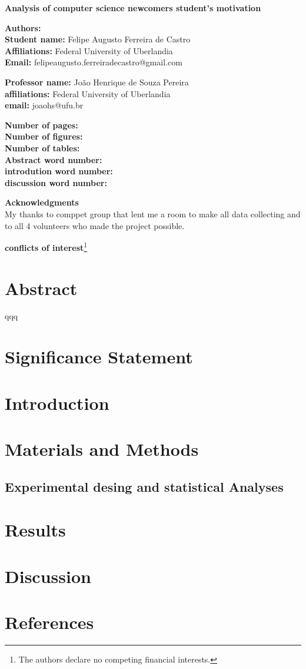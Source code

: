 \documentclass[12pt,openright,a4paper]{article}
\begin{document}
	\linespread{1.5}
 \fontsize{16}{10}\selectfont \centering \textbf{Analysis of computer science newcomers student's motivation} \\
	\fontsize{14}{10}\selectfont {Analysis of student's motivation}\newline

\fontsize{12}{10}
\flushleft
	\textbf{Authors:}\\
	\textbf{Student name:} Felipe Augusto Ferreira de Castro\\
	\textbf{Affiliations:} Federal University of Uberlandia\\
	\textbf{Email:} felipeaugusto.ferreiradecastro@gmail.com \newline
	
\textbf{Professor name:} João Henrique de Souza Pereira\\
\textbf{affiliations:} Federal University of Uberlandia\\
\textbf{email:} joaohs@ufu.br\newline

\textbf{Number of pages:}\\
\textbf{Number of figures:}\\
\textbf{Number of tables:}\\
\textbf{Abstract word number:}\\
\textbf{introdution word number:}\\
\textbf{discussion word number:}\newline
	
\textbf{Acknowledgments}\\	
My thanks to comppet group that lent me a room to make all data collecting and to all 4 volunteers who made the project possible.\newline

\textbf{conflicts of interest}\footnote{The authors declare no competing financial interests.}

\newpage
\tableofcontents
\newpage
\section{Abstract}
qqq

\section{Significance Statement}
\section{Introduction}
\section{Materials and Methods}
\subsection{Experimental desing and statistical Analyses}
\section{Results}
\section{Discussion}
\section{References}
\end{document}
